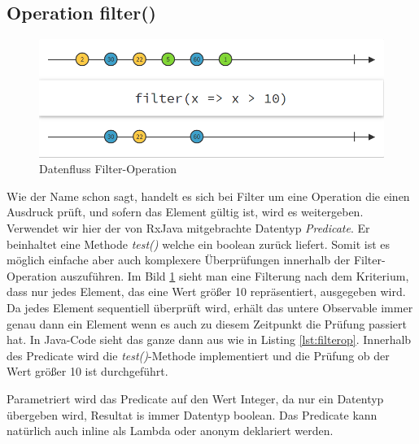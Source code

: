 \subsection{Operation filter()}
\begin{figure}
	\centering
	\includegraphics[width=1\textwidth]{Abb/filter}
	\caption{Datenfluss Filter-Operation}
	\label{pic:filter}
\end{figure}
Wie der Name schon sagt, handelt es sich bei Filter um eine Operation die einen Ausdruck prüft, und sofern das Element gültig ist, wird es weitergeben. Verwendet wir hier der von RxJava mitgebrachte Datentyp \textit{Predicate}. Er beinhaltet eine Methode \textit{test()} welche ein boolean zurück liefert. Somit ist es möglich einfache aber auch komplexere Überprüfungen innerhalb der Filter-Operation auszuführen. Im Bild \ref{pic:filter} sieht man eine Filterung nach dem Kriterium, dass nur jedes Element, das eine Wert größer 10 repräsentiert, ausgegeben wird. Da jedes Element sequentiell überprüft wird, erhält das untere Observable immer genau dann ein Element wenn es auch zu diesem Zeitpunkt die Prüfung passiert hat. In Java-Code sieht das ganze dann aus wie in Listing \ref{lst:filterop}. Innerhalb des Predicate wird die \textit{test()}-Methode implementiert und die Prüfung ob der Wert größer 10 ist durchgeführt. 
 
Parametriert wird das Predicate auf den Wert Integer, da nur ein Datentyp übergeben wird, Resultat is immer Datentyp boolean. Das Predicate kann natürlich auch inline als Lambda oder anonym deklariert werden.
